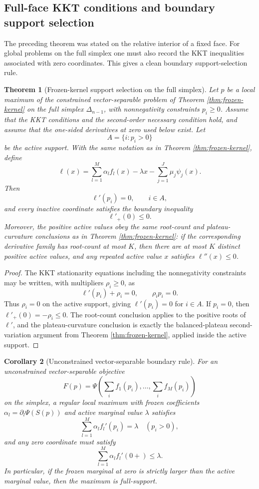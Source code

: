 \documentclass[11pt]{article}
\newtheorem{theorem}{Theorem}[section]
\newtheorem{corollary}[theorem]{Corollary}
\theoremstyle{definition}
\begin{document}
\subsection{Full-face KKT conditions and boundary support selection}\label{subsec:boundary-selection}

The preceding theorem was stated on the relative interior of a fixed face.  For global problems on the full simplex one must also record the KKT inequalities associated with zero coordinates.  This gives a clean boundary support-selection rule.

\begin{theorem}[Frozen-kernel support selection on the full simplex]\label{thm:full-face-kkt}
Let $p$ be a local maximum of the constrained vector-separable problem of Theorem \ref{thm:frozen-kernel} on the full simplex $\Delta_{n-1}$, with nonnegativity constraints $p_i\ge0$.  Assume that the KKT conditions and the second-order necessary condition hold, and assume that the one-sided derivatives at zero used below exist.  Let
\[
  A=\{i:p_i>0\}
\]
be the active support.  With the same notation as in Theorem \ref{thm:frozen-kernel}, define
\[
  \ell(x)=\sum_{l=1}^M \alpha_l f_l(x)-\lambda x-
       \sum_{j=1}^J \mu_j\psi_j(x).
\]
Then
\[
  \ell'(p_i)=0,\qquad i\in A,
\]
and every inactive coordinate satisfies the boundary inequality
\[
  \ell'_+(0)\le0.
\]
Moreover, the positive active values obey the same root-count and plateau-curvature conclusions as in Theorem \ref{thm:frozen-kernel}: if the corresponding derivative family has root-count at most $K$, then there are at most $K$ distinct positive active values, and any repeated active value $x$ satisfies $\ell''(x)\le0$.
\end{theorem}

\begin{proof}
The KKT stationarity equations including the nonnegativity constraints may be written, with multipliers $\rho_i\ge0$, as
\[
  \ell'(p_i)+\rho_i=0,
  \qquad
  \rho_i p_i=0.
\]
Thus $\rho_i=0$ on the active support, giving $\ell'(p_i)=0$ for $i\in A$.  If $p_i=0$, then $\ell'_+(0)=-\rho_i\le0$.  The root-count conclusion applies to the positive roots of $\ell'$, and the plateau-curvature conclusion is exactly the balanced-plateau second-variation argument from Theorem \ref{thm:frozen-kernel}, applied inside the active support.
\end{proof}

\begin{corollary}[Unconstrained vector-separable boundary rule]\label{cor:unconstrained-boundary}
For an unconstrained vector-separable objective
\[
  F(p)=\Psi\left(\sum_i f_1(p_i),\ldots,\sum_i f_M(p_i)\right)
\]
on the simplex, a regular local maximum with frozen coefficients $\alpha_l=\partial_l\Psi(S(p))$ and active marginal value $\lambda$ satisfies
\[
  \sum_{l=1}^M \alpha_l f_l'(p_i)=\lambda\quad(p_i>0),
\]
and any zero coordinate must satisfy
\[
  \sum_{l=1}^M \alpha_l f_l'(0+)\le \lambda.
\]
In particular, if the frozen marginal at zero is strictly larger than the active marginal value, then the maximum is full-support.
\end{corollary}
\end{document}

